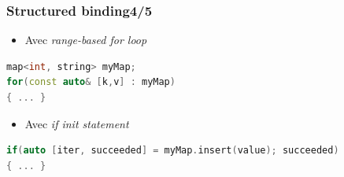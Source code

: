 \documentclass[C++.tex]{subfiles}
\begin{document}
\begin{frame}[fragile]
	\frametitle{Structured binding\titlehfill{}4/5}
	\begin{itemize}
		\item Avec \textit{range-based for loop}
	\end{itemize}

	\begin{lstlisting}[language=C++]
map<int, string> myMap;    
for(const auto& [k,v] : myMap) 
{ ... } \end{lstlisting}

	\begin{itemize}
		\item Avec \textit{if init statement}
	\end{itemize}

	\begin{lstlisting}[language=C++]
if(auto [iter, succeeded] = myMap.insert(value); succeeded)
{ ... }\end{lstlisting}


\end{frame}
\end{document}
